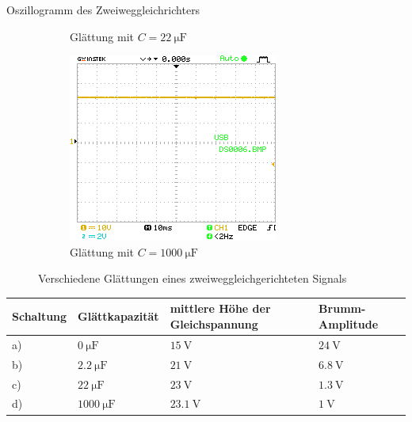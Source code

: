 \documentclass{article}
\theoremstyle{definition}
\begin{document}
\begin{aufgabe}{Oszillogramm des Zweiweggleichrichters}
\begin{figure}[H]
\begin{subfigure}[b]{0.49 \textwidth}
            \caption{Glättung mit $C = \SI{22}{\micro\farad}$}
            \label{a3_c}
        \end{subfigure}
        \hfill
        \begin{subfigure}[b]{0.49 \textwidth}
            \includegraphics[width=\textwidth]{MesswerteVersuch2/DS0006.png}
            \caption{Glättung mit $C = \SI{1000}{\micro\farad}$}
            \label{a3_d}
        \end{subfigure}
        \caption{Verschiedene Glättungen eines zweiweggleichgerichteten Signals}
    \end{figure}
    \begin{table}[H]
        \centering
        \begin{tabular}{|l|l|l|l|}
            \hline
            Schaltung & Glättkapazität & mittlere Höhe der Gleichspannung & Brumm-Amplitude  \\
            \hline
            a) & $\SI{0}{\micro\farad}$ & $\SI{15}{\volt}$ & $\SI{24}{\volt}$ \\
            b) & $\SI{2.2}{\micro\farad}$ & $\SI{21}{\volt}$ & $\SI{6.8}{\volt}$ \\
            c) & $\SI{22}{\micro\farad}$ & $\SI{23}{\volt}$ & $\SI{1.3}{\volt}$ \\
            d) & $\SI{1000}{\micro\farad}$ & $\SI{23.1}{\volt}$ & $\SI{1}{\volt}$ \\
            \hline
        \end{tabular}

\end{table}
\end{aufgabe}
\end{document}

